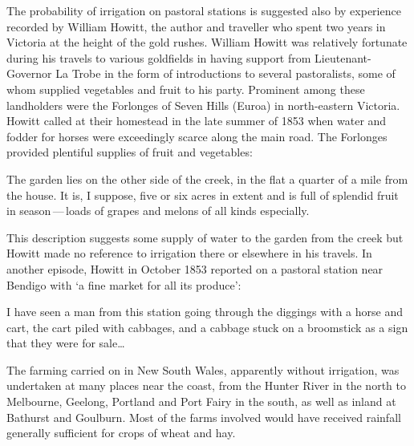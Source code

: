 The probability of irrigation on pastoral stations is suggested also
by experience recorded by William Howitt, the author and traveller who
spent two years in Victoria at the height of the gold rushes.  William
Howitt  was relatively fortunate during his
travels to various goldfields in having support from
Lieutenant-Governor La Trobe  in the form
of introductions to several pastoralists, some of whom supplied
vegetables and fruit to his party.
Prominent among these landholders were the Forlonges  of Seven Hills  (Euroa)  in north-eastern Victoria.  Howitt called at their homestead in
the late summer of 1853 when water and fodder for
horses were exceedingly scarce along the main road.  The
Forlonges provided plentiful supplies of fruit and vegetables:
\begin{Quote}
	The garden lies on the other side of the creek, in the flat a
	quarter of a mile from the house. It is, I suppose, five or
	six acres in extent and is full of splendid fruit
	in season\,---\,loads of grapes and melons of all kinds
	especially.
\end{Quote}

This description suggests some supply of water to the garden from the
creek but Howitt made no reference to irrigation there or elsewhere in
his travels.  In another episode, Howitt in October 1853 reported on a
pastoral station near Bendigo with `a fine market for all its
produce':
\begin{Quote}
	I have seen a man from this station going through the diggings
	with a horse and cart, the cart piled with cabbages, and a
	cabbage stuck on a broomstick as a sign that they were for
	sale\ldots{}
\end{Quote}

The farming carried on in New South Wales, apparently without
irrigation, was undertaken at many places near the coast, from the
Hunter River  in the north to Melbourne,
 Geelong,   Portland
 and Port Fairy  in the
south, as well as inland at Bathurst  and
Goulburn.  Most of the farms involved would have
received rainfall generally sufficient for crops of wheat
and hay.

